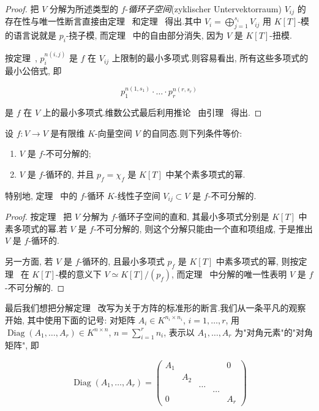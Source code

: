\begin{proof}
把 $V$ 分解为所述类型的 $f$-\emph{循环子空间}(\textup{zyklischer Untervektorraum}) $V_{ij}$ 的存在性与唯一性断言直接由定理~ 和定理~ 得出.其中 $V_i = \bigoplus_{j = 1}^{s_i} V_{ij}$ 用 $K[T]$-模的语言说就是 $p_i$-挠子模, 而定理~ 中的自由部分消失, 因为 $V$ 是 $K[T]$-扭模.

按定理~, $p_i^{n(i, j)}$ 是 $f$ 在 $V_{ij}$ 上限制的最小多项式.则容易看出, 所有这些多项式的最小公倍式, 即

\[
p_1^{n(1, s_1)} \cdot \ldots \cdot p_r^{n(r, s_r)}\]

是 $f$ 在 $V$ 上的最小多项式.维数公式最后利用推论~ 由引理~ 得出.
\end{proof}

\begin{corollary}\label{cor:6.5.7}
设 $f \colon V \longrightarrow V$ 是有限维 $K$-向量空间 $V$ 的自同态.则下列条件等价:
\begin{enumerate}
\item[(i)] $V$ 是 $f$-不可分解的;
\item[(ii)] $V$ 是 $f$-循环的, 并且 $p_f = \chi_f$ 是 $K[T]$ 中某个素多项式的幂.
\end{enumerate}
特别地, 定理~ 中的 $f$-循环 $K$-线性子空间 $V_{ij} \subset V$ 是 $f$-不可分解的.
\end{corollary}

\begin{proof}
按定理~ 把 $V$ 分解为 $f$-循环子空间的直和, 其最小多项式分别是 $K[T]$ 中素多项式的幂.若 $V$ 是 $f$-不可分解的, 则这个分解只能由一个直和项组成, 于是推出 $V$ 是 $f$-循环的.

另一方面, 若 $V$ 是 $f$-循环的, 且最小多项式 $p_f$ 是 $K[T]$ 中素多项式的幂, 则按定理~ 在 $K[T]$-模的意义下 $V \simeq K[T]/(p_f)$, 而定理~ 中分解的唯一性表明 $V$ 是 $f$-不可分解的.
\end{proof}

最后我们想把分解定理~ 改写为关于方阵的标准形的断言.我们从一条平凡的观察开始, 其中使用下面的记号: 对矩阵 $A_i \in K^{n_i \times n_i}$, $i = 1, \ldots, r$, 用 $\operatorname{Diag}(A_1, \ldots, A_r) \in K^{n \times n}$, $n = \sum_{i = 1}^{r} n_i$, 表示以 $A_1, \ldots, A_r$ 为"对角元素"的"对角矩阵", 即

\[
\operatorname{Diag}(A_1, \ldots, A_r) = \left(\begin{array}{ccccc}
A_1 & & & & 0 \\
 & A_2 & & & \\
 & & \ldots & & \\
 & & & \ldots & \\
0 & & & & A_r
\end{array}\right)\]

